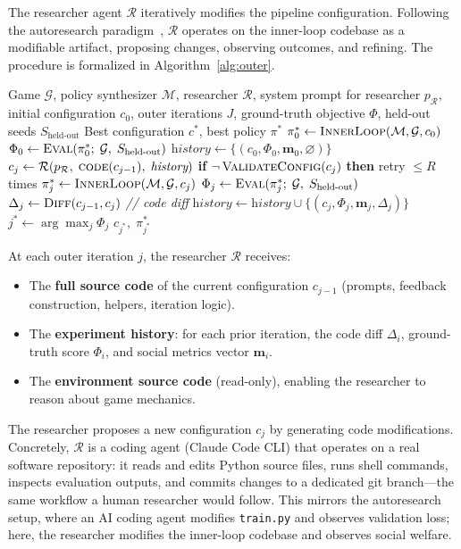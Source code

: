 \documentclass[sigconf,authordraft]{acmart}
\newcommand{\cR}{\mathcal{R}}
\newcommand{\cM}{\mathcal{M}}
\newcommand{\cG}{\mathcal{G}}
\newcommand{\bm}{\mathbf{m}}
\begin{document}
The researcher agent $\cR$ iteratively modifies the pipeline configuration. Following the autoresearch paradigm~\cite{karpathy2026}, $\cR$ operates on the inner-loop codebase as a modifiable artifact, proposing changes, observing outcomes, and refining. The procedure is formalized in Algorithm~\ref{alg:outer}.

\begin{algorithm}[t]
\caption{Two-Level Automated Research}
\label{alg:outer}
\begin{algorithmic}[1]
\Require Game $\cG$, policy synthesizer $\cM$, researcher $\cR$, system prompt for researcher $p_{\cR}$, initial configuration $c_0$, outer iterations $J$, ground-truth objective $\Phi$, held-out seeds $S_{\text{held-out}}$
\Ensure Best configuration $c^*$, best policy $\pi^*$
\State $\pi^*_0 \leftarrow \textsc{InnerLoop}(\cM, \cG, c_0)$
\State $\Phi_0 \leftarrow \textsc{Eval}(\pi^*_0;\; \cG,\; S_{\text{held-out}})$
\State $\textit{history} \leftarrow \{(c_0, \Phi_0, \bm_0, \varnothing)\}$
  \State $c_j \leftarrow \cR\!\left(p_{\cR},\; \textsc{code}(c_{j-1}),\; \textit{history}\right)$
  \State \textbf{if} $\neg\,\textsc{ValidateConfig}(c_j)$ \textbf{then} retry $\leq R$ times
  \State $\pi^*_j \leftarrow \textsc{InnerLoop}(\cM, \cG, c_j)$
  \State $\Phi_j \leftarrow \textsc{Eval}(\pi^*_j;\; \cG,\; S_{\text{held-out}})$
  \State $\Delta_j \leftarrow \textsc{Diff}(c_{j-1}, c_j)$ \hfill \textit{// code diff}
  \State $\textit{history} \leftarrow \textit{history} \cup \{(c_j, \Phi_j, \bm_j, \Delta_j)\}$
\EndFor
\State $j^* \leftarrow \arg\max_j \Phi_j$
\State \Return $c_{j^*},\; \pi^*_{j^*}$
\end{algorithmic}
\end{algorithm}

At each outer iteration $j$, the researcher $\cR$ receives:
\begin{itemize}
  \item The \textbf{full source code} of the current configuration $c_{j-1}$ (prompts, feedback construction, helpers, iteration logic).
  \item The \textbf{experiment history}: for each prior iteration, the code diff $\Delta_i$, ground-truth score $\Phi_i$, and social metrics vector $\bm_i$.
  \item The \textbf{environment source code} (read-only), enabling the researcher to reason about game mechanics.
\end{itemize}

The researcher proposes a new configuration $c_j$ by generating code modifications. Concretely, $\cR$ is a coding agent (Claude Code CLI) that operates on a real software repository: it reads and edits Python source files, runs shell commands, inspects evaluation outputs, and commits changes to a dedicated git branch---the same workflow a human researcher would follow. This mirrors the autoresearch setup, where an AI coding agent modifies \texttt{train.py} and observes validation loss; here, the researcher modifies the inner-loop codebase and observes social welfare.
\end{document}
